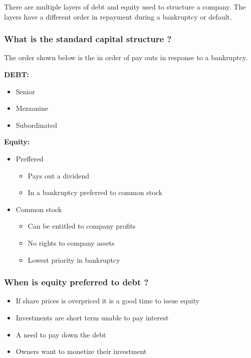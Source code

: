 \documentclass[11pt]{scrartcl} %
\begin{document}
There are multiple layers of debt and equity used to structure a company. The layers have a different order in repayment during a bankruptcy or default.

\subsubsection{What is the standard capital structure ?}

The order shown below is the in order of pay outs in response to a bankruptcy.

\textbf{DEBT:}

\begin{itemize}
	\item Senior
	\item Mezzanine
	\item Subordinated
\end{itemize}

\textbf{Equity:}

\begin{itemize}
	\item Preffered
	\begin{itemize}
		\item Pays out a dividend
		\item In a bankruptcy preferred to common stock
	\end{itemize}
	\item Common stock
	\begin{itemize}
		\item Can be entitled to company profits
		\item No rights to company assets
		\item Lowest priority in bankruptcy
	\end{itemize}
\end{itemize}

\subsubsection{When is equity preferred to debt ?}

\begin{itemize}
	\item If share prices is overpriced it is a good time to issue equity
	\item Investments are short term unable to pay interest
	\item A need to pay down the debt
	\item Owners want to monetize their investment
\end{itemize}
\end{document}
